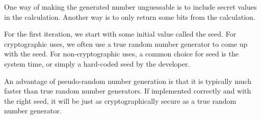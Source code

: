One way of making the generated number unguessable is to include secret values in the calculation. Another way is to only return some bits from the calculation.

For the first iteration, we start with some initial value called the seed. For cryptographic uses, we often use a true random number generator to come up with the seed. For non-cryptographic uses, a common choice for seed is the system time, or simply a hard-coded seed by the developer.

An advantage of pseudo-random number generation is that it is typically much faster than true random number generators. If implemented correctly and with the right seed, it will be just as cryptographically secure as a true random number generator.
